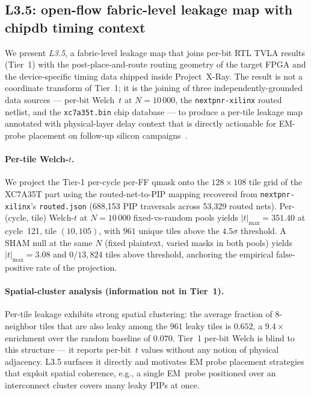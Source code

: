 
\subsection{L3.5: open-flow fabric-level leakage map with chipdb timing context}
\label{sec:l35-standalone}

We present \emph{L3.5}, a fabric-level leakage map that joins per-bit RTL TVLA
results (Tier~1) with the post-place-and-route routing geometry of the target
FPGA and the device-specific timing data shipped inside Project~X-Ray.  The
result is not a coordinate transform of Tier~1; it is the joining of three
independently-grounded data sources --- per-bit Welch~$t$ at $N{=}10\,000$, the
\texttt{nextpnr-xilinx} routed netlist, and the \texttt{xc7a35t.bin} chip
database --- to produce a per-tile leakage map annotated with physical-layer
delay context that is directly actionable for EM-probe placement on
follow-up silicon campaigns~\cite{mangard2007power}.

\paragraph{Per-tile Welch-$t$.}
We project the Tier-1 per-cycle per-FF qmask onto the $128 \times 108$ tile
grid of the XC7A35T part using the routed-net-to-PIP mapping recovered from
\texttt{nextpnr-xilinx}'s \texttt{routed.json} (688{,}153 PIP traversals
across 53{,}329 routed nets).  Per-(cycle, tile) Welch-$t$ at $N{=}10\,000$
fixed-vs-random pools yields $|t|_{\max}=351.40$ at cycle~121, tile
$(10,105)$, with $961$ unique tiles above the $4.5\sigma$ threshold.  A SHAM
null at the same $N$ (fixed plaintext, varied masks in both pools) yields
$|t|_{\max}=3.08$ and $0/13{,}824$ tiles above threshold, anchoring the
empirical false-positive rate of the projection.

\paragraph{Spatial-cluster analysis (information not in Tier~1).}
Per-tile leakage exhibits strong spatial clustering: the average fraction of
$8$-neighbor tiles that are also leaky among the $961$ leaky tiles is $0.652$,
a $9.4\times$ enrichment over the random baseline of $0.070$.  Tier~1 per-bit
Welch is blind to this structure --- it reports per-bit~$t$ values without any
notion of physical adjacency.  L3.5 surfaces it directly and motivates EM
probe placement strategies that exploit spatial coherence, e.g., a single
EM~probe positioned over an interconnect cluster covers many leaky PIPs at
once.

